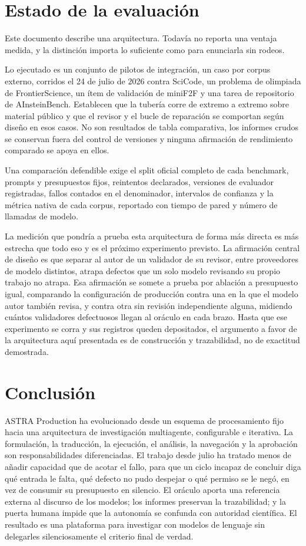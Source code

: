 \documentclass[11pt,a4paper]{article}
\begin{document}
\section{Estado de la evaluación}

Este documento describe una arquitectura. Todavía no reporta una ventaja medida, y la distinción importa lo suficiente como para enunciarla sin rodeos.

Lo ejecutado es un conjunto de pilotos de integración, un caso por corpus externo, corridos el 24 de julio de 2026 contra SciCode, un problema de olimpiada de FrontierScience, un ítem de validación de miniF2F y una tarea de repositorio de AInsteinBench. Establecen que la tubería corre de extremo a extremo sobre material público y que el revisor y el bucle de reparación se comportan según diseño en esos casos. No son resultados de tabla comparativa, los informes crudos se conservan fuera del control de versiones y ninguna afirmación de rendimiento comparado se apoya en ellos.

Una comparación defendible exige el split oficial completo de cada benchmark, prompts y presupuestos fijos, reintentos declarados, versiones de evaluador registradas, fallos contados en el denominador, intervalos de confianza y la métrica nativa de cada corpus, reportado con tiempo de pared y número de llamadas de modelo.

La medición que pondría a prueba esta arquitectura de forma más directa es más estrecha que todo eso y es el próximo experimento previsto. La afirmación central de diseño es que separar al autor de un validador de su revisor, entre proveedores de modelo distintos, atrapa defectos que un solo modelo revisando su propio trabajo no atrapa. Esa afirmación se somete a prueba por ablación a presupuesto igual, comparando la configuración de producción contra una en la que el modelo autor también revisa, y contra otra sin revisión independiente alguna, midiendo cuántos validadores defectuosos llegan al oráculo en cada brazo. Hasta que ese experimento se corra y sus registros queden depositados, el argumento a favor de la arquitectura aquí presentada es de construcción y trazabilidad, no de exactitud demostrada.

\section{Conclusión}

ASTRA Production ha evolucionado desde un esquema de procesamiento fijo hacia una arquitectura de investigación multiagente, configurable e iterativa. La formulación, la traducción, la ejecución, el análisis, la navegación y la aprobación son responsabilidades diferenciadas. El trabajo desde julio ha tratado menos de añadir capacidad que de acotar el fallo, para que un ciclo incapaz de concluir diga qué entrada le falta, qué defecto no pudo despejar o qué permiso se le negó, en vez de consumir su presupuesto en silencio. El oráculo aporta una referencia externa al discurso de los modelos; los informes preservan la trazabilidad; y la puerta humana impide que la autonomía se confunda con autoridad científica. El resultado es una plataforma para investigar con modelos de lenguaje sin delegarles silenciosamente el criterio final de verdad.
\end{document}
